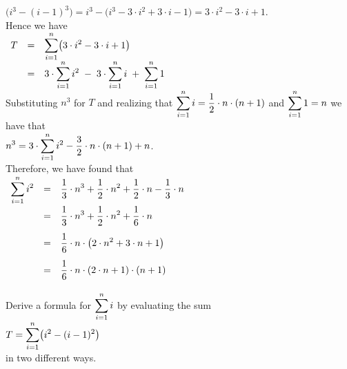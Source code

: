 $ \bigl(i^3 - (i-1)^3\bigr) = i^3 - \bigl(i^3 - 3 \cdot i^2 + 3 \cdot i - 1) = 3 \cdot i^2 - 3 \cdot i + 1$.
\\[0.2cm]
Hence we have
\\[0.2cm]
\hspace*{1.3cm}
$
\begin{array}{lclcl}
  T & = & \displaystyle \sum\limits_{i=1}^n \bigl(3 \cdot i^2 - 3 \cdot i + 1\bigr) \\[0.2cm]
    & = & \displaystyle 3 \cdot \sum\limits_{i=1}^n i^2 \; -\;  3 \cdot \sum\limits_{i=1}^n i \;+\; \sum\limits_{i=1}^n 1
\end{array}
$
\\[0.2cm]
Substituting $n^3$ for $T$ and realizing that $\displaystyle\sum\limits_{i=1}^n i = \frac{1}{2} \cdot n \cdot (n+1)$ and
$\displaystyle\sum\limits_{i=1}^n 1 = n$ we have that
\\[0.2cm]
\hspace*{1.3cm}
$\displaystyle n^3 = 3 \cdot \sum\limits_{i=1}^n i^2 - \frac{3}{2} \cdot n \cdot (n+1) + n$.
\\[0.2cm]
Therefore, we have found that
\\[0.2cm]
\hspace*{1.3cm}
$
\begin{array}{lcl}
\displaystyle \sum\limits_{i=1}^n i^2 & = &  \displaystyle\frac{1}{3} \cdot n^3 + \frac{1}{2} \cdot n^2 + \frac{1}{2} \cdot n -
                                  \frac{1}{3} \cdot n  \\[0.4cm]
                          & = &   \displaystyle\frac{1}{3} \cdot n^3 + \frac{1}{2} \cdot n^2 + \frac{1}{6} \cdot n
  \\[0.4cm]
                         & = &   \displaystyle\frac{1}{6} \cdot n \cdot \bigl(2 \cdot n^2 + 3 \cdot n + 1 \bigr)
  \\[0.4cm]
                         & = &   \displaystyle\frac{1}{6} \cdot n \cdot (2 \cdot n + 1) \cdot (n + 1)  \\[0.2cm]
\end{array}
$

\exercise
Derive a formula for $\displaystyle\sum\limits_{i=1}^n i$ by evaluating the sum \\
\hspace*{1.3cm}
$\displaystyle T = \sum\limits_{i=1}^n \bigl(i^2 - (i-1)^2\bigr)$
\\[0.2cm]
in two different ways.  \eoxs

